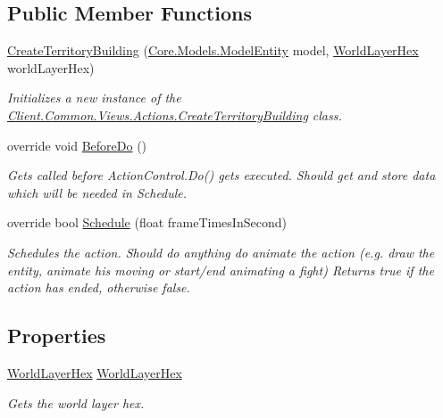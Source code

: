 \subsection*{Public Member Functions}
\begin{DoxyCompactItemize}
\item 
\hyperlink{classClient_1_1Common_1_1Views_1_1Actions_1_1CreateTerritoryBuilding_a65cc09c02e5ec55c977ce38d7400a49b}{Create\+Territory\+Building} (\hyperlink{classCore_1_1Models_1_1ModelEntity}{Core.\+Models.\+Model\+Entity} model, \hyperlink{classClient_1_1Common_1_1Views_1_1WorldLayerHex}{World\+Layer\+Hex} world\+Layer\+Hex)
\begin{DoxyCompactList}\small\item\em Initializes a new instance of the \hyperlink{classClient_1_1Common_1_1Views_1_1Actions_1_1CreateTerritoryBuilding}{Client.\+Common.\+Views.\+Actions.\+Create\+Territory\+Building} class. \end{DoxyCompactList}\item 
override void \hyperlink{classClient_1_1Common_1_1Views_1_1Actions_1_1CreateTerritoryBuilding_a7b133524b3bcd1043529e351dca539f0}{Before\+Do} ()
\begin{DoxyCompactList}\small\item\em Gets called before Action\+Control.\+Do() gets executed. Should get and store data which will be needed in Schedule. \end{DoxyCompactList}\item 
override bool \hyperlink{classClient_1_1Common_1_1Views_1_1Actions_1_1CreateTerritoryBuilding_a9b0bdcf4eeace4c28e56c85c7ecb1778}{Schedule} (float frame\+Times\+In\+Second)
\begin{DoxyCompactList}\small\item\em Schedules the action. Should do anything do animate the action (e.\+g. draw the entity, animate his moving or start/end animating a fight) Returns true if the action has ended, otherwise false. \end{DoxyCompactList}\end{DoxyCompactItemize}
\subsection*{Properties}
\begin{DoxyCompactItemize}
\item 
\hyperlink{classClient_1_1Common_1_1Views_1_1WorldLayerHex}{World\+Layer\+Hex} \hyperlink{classClient_1_1Common_1_1Views_1_1Actions_1_1CreateTerritoryBuilding_a6e025a3b64f4b7cef83761859c266d57}{World\+Layer\+Hex}
\begin{DoxyCompactList}\small\item\em Gets the world layer hex. \end{DoxyCompactList}\end{DoxyCompactItemize}
